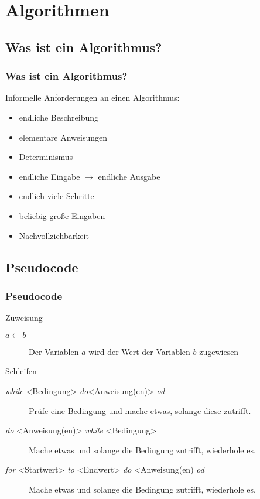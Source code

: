 \section{Algorithmen}

\subsection{Was ist ein Algorithmus?}
\begin{frame}
	\frametitle{Was ist ein Algorithmus?}
	Informelle Anforderungen an einen Algorithmus:
	\begin{itemize}
		\pause
		\item endliche Beschreibung
		\pause
		\item elementare Anweisungen
		\pause
		\item Determinismus
		\pause
		\item endliche Eingabe $\rightarrow$ endliche Ausgabe
		\pause
		\item endlich viele Schritte
		\pause
		\item beliebig große Eingaben
		\pause
		\item Nachvollziehbarkeit
	\end{itemize}
\end{frame}

\subsection{Pseudocode}
\begin{frame}
	\frametitle{Pseudocode}
	\begin{block}{Zuweisung}
		\begin{description}
			\item[$a\leftarrow b$] Der Variablen $a$ wird der Wert der Variablen $b$ zugewiesen
		\end{description}
	\end{block}
	\pause
	\begin{block}{Schleifen}
		\begin{description}
			\item[\emph{while} <Bedingung> \emph{do}<Anweisung(en)> \emph{od}] Prüfe eine Bedingung und mache etwas, solange diese zutrifft.
			\pause
			\item[\emph{do} <Anweisung(en)> \emph{while} <Bedingung>] Mache etwas und solange die Bedingung zutrifft, wiederhole es.
			\pause
			\item[\emph{for} <Startwert> \emph{to} <Endwert> \emph{do} <Anweisung(en) \emph{od}] Mache etwas und solange die Bedingung zutrifft, wiederhole es.
		\end{description}
	\end{block}
\end{frame}


